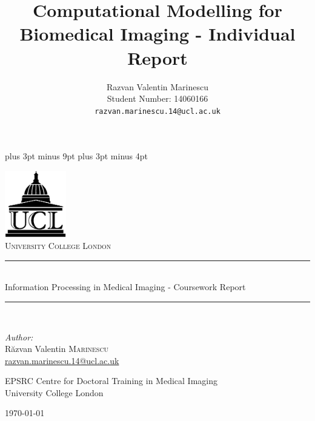 \documentclass[11pt,a4paper,oneside]{report}
\title{Computational Modelling for Biomedical Imaging - Individual Report}
\author{
Razvan Valentin Marinescu\\
Student Number: 14060166\\
\texttt{razvan.marinescu.14@ucl.ac.uk}
}
\begin{document}
\belowdisplayskip=12pt plus 3pt minus 9pt
\belowdisplayshortskip=7pt plus 3pt minus 4pt

\begin{titlepage}
\begin{center}

\includegraphics[width=0.2\textwidth]{ucl-logo2}~\\[1cm]

\textsc{\LARGE University College London}\\[1.5cm]

\newcommand{\HRule}{\rule{\linewidth}{0.5mm}}

\HRule \\[0.4cm]
{ \Large Information Processing in Medical Imaging - Coursework Report \\[0.4cm] }

\HRule \\[1.5cm]

\begin{minipage}{0.4\textwidth}
\centering
\emph{Author:}\\
R\u{a}zvan Valentin \textsc{Marinescu}\\
\href{razvan.marinescu.14@ucl.ac.uk}{razvan.marinescu.14@ucl.ac.uk}\\
\end{minipage}


\vfill

\vfill
\vfill

EPSRC Centre for Doctoral Training in Medical Imaging\\ University College London

\vfill

{\large \today}

\end{center}
\end{titlepage}


\end{document}
